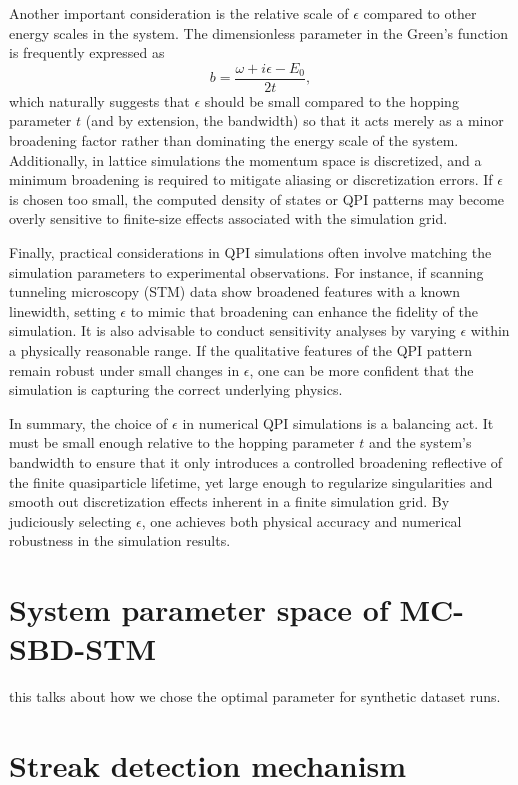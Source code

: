 Another important consideration is the relative scale of $\epsilon$ compared to other energy scales in the system. The dimensionless parameter in the Green’s function is frequently expressed as
\[
b = \frac{\omega + i\epsilon - E_0}{2t},
\]
which naturally suggests that $\epsilon$ should be small compared to the hopping parameter $t$ (and by extension, the bandwidth) so that it acts merely as a minor broadening factor rather than dominating the energy scale of the system. Additionally, in lattice simulations the momentum space is discretized, and a minimum broadening is required to mitigate aliasing or discretization errors. If $\epsilon$ is chosen too small, the computed density of states or QPI patterns may become overly sensitive to finite-size effects associated with the simulation grid.

Finally, practical considerations in QPI simulations often involve matching the simulation parameters to experimental observations. For instance, if scanning tunneling microscopy (STM) data show broadened features with a known linewidth, setting $\epsilon$ to mimic that broadening can enhance the fidelity of the simulation. It is also advisable to conduct sensitivity analyses by varying $\epsilon$ within a physically reasonable range. If the qualitative features of the QPI pattern remain robust under small changes in $\epsilon$, one can be more confident that the simulation is capturing the correct underlying physics.

In summary, the choice of $\epsilon$ in numerical QPI simulations is a balancing act. It must be small enough relative to the hopping parameter $t$ and the system's bandwidth to ensure that it only introduces a controlled broadening reflective of the finite quasiparticle lifetime, yet large enough to regularize singularities and smooth out discretization effects inherent in a finite simulation grid. By judiciously selecting $\epsilon$, one achieves both physical accuracy and numerical robustness in the simulation results.

\chapter{System parameter space of MC-SBD-STM}\label{appen:system_param}
this talks about how we chose the optimal parameter for synthetic dataset runs. 

\chapter{Streak detection mechanism}\label{appen:streak_detection}
